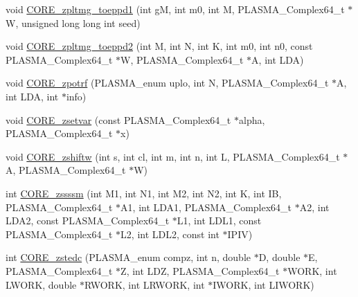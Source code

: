 \begin{DoxyCompactItemize}
void \hyperlink{group__CORE__PLASMA__Complex64__t_gac5fd071f65b751b85ae8f9edc96091c5_gac5fd071f65b751b85ae8f9edc96091c5}{C\+O\+R\+E\+\_\+zpltmg\+\_\+toeppd1} (int g\+M, int m0, int M, P\+L\+A\+S\+M\+A\+\_\+\+Complex64\+\_\+t $\ast$W, unsigned long long int seed)
\item 
void \hyperlink{group__CORE__PLASMA__Complex64__t_ga3b8fa274726711fa2822facb1bfc62e8_ga3b8fa274726711fa2822facb1bfc62e8}{C\+O\+R\+E\+\_\+zpltmg\+\_\+toeppd2} (int M, int N, int K, int m0, int n0, const P\+L\+A\+S\+M\+A\+\_\+\+Complex64\+\_\+t $\ast$W, P\+L\+A\+S\+M\+A\+\_\+\+Complex64\+\_\+t $\ast$A, int L\+D\+A)
\item 
void \hyperlink{group__CORE__PLASMA__Complex64__t_ga349f94b8d8531c5252b86d0d742a7677_ga349f94b8d8531c5252b86d0d742a7677}{C\+O\+R\+E\+\_\+zpotrf} (P\+L\+A\+S\+M\+A\+\_\+enum uplo, int N, P\+L\+A\+S\+M\+A\+\_\+\+Complex64\+\_\+t $\ast$A, int L\+D\+A, int $\ast$info)
\item 
void \hyperlink{group__CORE__PLASMA__Complex64__t_ga4c14e40532835e8440e58f1e49f34411_ga4c14e40532835e8440e58f1e49f34411}{C\+O\+R\+E\+\_\+zsetvar} (const P\+L\+A\+S\+M\+A\+\_\+\+Complex64\+\_\+t $\ast$alpha, P\+L\+A\+S\+M\+A\+\_\+\+Complex64\+\_\+t $\ast$x)
\item 
void \hyperlink{group__CORE__PLASMA__Complex64__t_gab428ec3aa4b2ba5eff571222b7bc907c_gab428ec3aa4b2ba5eff571222b7bc907c}{C\+O\+R\+E\+\_\+zshiftw} (int s, int cl, int m, int n, int L, P\+L\+A\+S\+M\+A\+\_\+\+Complex64\+\_\+t $\ast$A, P\+L\+A\+S\+M\+A\+\_\+\+Complex64\+\_\+t $\ast$W)
\item 
int \hyperlink{group__CORE__PLASMA__Complex64__t_gaff5ced9f6ea8c1e5d471f30dd7b14796_gaff5ced9f6ea8c1e5d471f30dd7b14796}{C\+O\+R\+E\+\_\+zssssm} (int M1, int N1, int M2, int N2, int K, int I\+B, P\+L\+A\+S\+M\+A\+\_\+\+Complex64\+\_\+t $\ast$A1, int L\+D\+A1, P\+L\+A\+S\+M\+A\+\_\+\+Complex64\+\_\+t $\ast$A2, int L\+D\+A2, const P\+L\+A\+S\+M\+A\+\_\+\+Complex64\+\_\+t $\ast$L1, int L\+D\+L1, const P\+L\+A\+S\+M\+A\+\_\+\+Complex64\+\_\+t $\ast$L2, int L\+D\+L2, const int $\ast$I\+P\+I\+V)
\item 
int \hyperlink{group__CORE__PLASMA__Complex64__t_ga9419df36ff5907e47551b032af2b0fac_ga9419df36ff5907e47551b032af2b0fac}{C\+O\+R\+E\+\_\+zstedc} (P\+L\+A\+S\+M\+A\+\_\+enum compz, int n, double $\ast$D, double $\ast$E, P\+L\+A\+S\+M\+A\+\_\+\+Complex64\+\_\+t $\ast$Z, int L\+D\+Z, P\+L\+A\+S\+M\+A\+\_\+\+Complex64\+\_\+t $\ast$W\+O\+R\+K, int L\+W\+O\+R\+K, double $\ast$R\+W\+O\+R\+K, int L\+R\+W\+O\+R\+K, int $\ast$I\+W\+O\+R\+K, int L\+I\+W\+O\+R\+K)

\end{DoxyCompactItemize}
